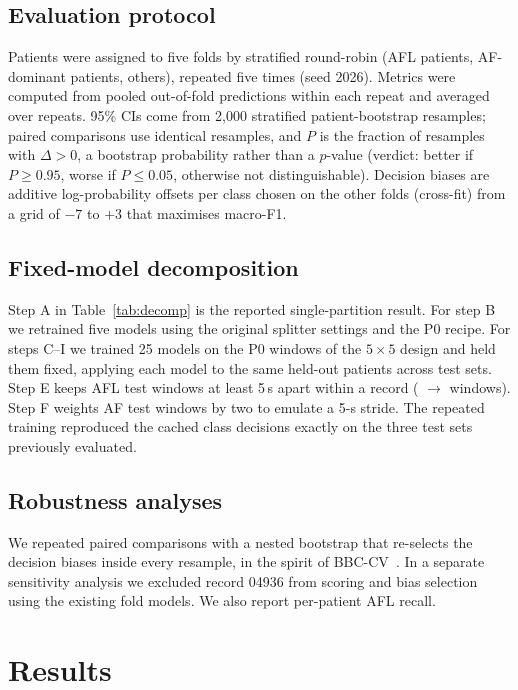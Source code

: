 \documentclass[conference,a4paper]{IEEEtran}
\begin{document}
\subsection{Evaluation protocol}
Patients were assigned to five folds by stratified round-robin (AFL patients, AF-dominant patients, others), repeated five times
(seed 2026). Metrics were computed from pooled out-of-fold predictions within each repeat and averaged over repeats. 95\% CIs come
from 2{,}000 stratified patient-bootstrap resamples; paired comparisons use identical resamples, and $P$ is the fraction of
resamples with $\Delta>0$, a bootstrap probability rather than a $p$-value (verdict: better if $P\geq0.95$, worse if
$P\leq0.05$, otherwise not distinguishable). Decision biases are additive log-probability
offsets per class chosen on the other folds (cross-fit) from a grid of $-7$ to $+3$ that maximises macro-F1.

\subsection{Fixed-model decomposition}
Step A in Table~\ref{tab:decomp} is the reported single-partition result. For step B we retrained five models using the
original splitter settings and the P0 recipe. For steps C--I we trained 25 models on the P0 windows of the $5\times5$ design
and held them fixed, applying each model to the same held-out patients across test sets. Step E keeps AFL test windows at
least 5\,s apart within a record (\nAflLab{} $\rightarrow$ \nAflThin{} windows). Step F weights AF test windows by two to emulate
a 5-s stride. The repeated training reproduced the cached class decisions exactly on the three test sets previously evaluated.

\subsection{Robustness analyses}
We repeated paired comparisons with a nested bootstrap that re-selects the decision biases inside every resample, in the
spirit of BBC-CV~\cite{tsamardinos2018}. In a separate sensitivity analysis we excluded record 04936 from scoring and bias
selection using the existing fold models. We also report per-patient AFL recall.

\section{Results}
\end{document}
